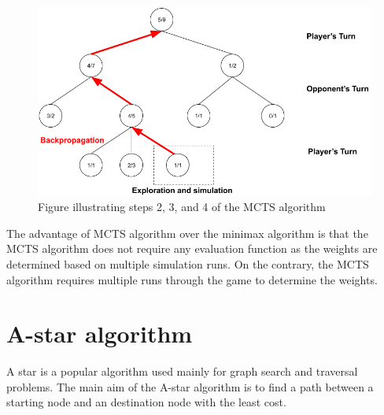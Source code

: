 \begin{figure}[!ht]
    \centering
    \includegraphics[width=\linewidth]{../img/MCTS2.png}
    \caption{Figure illustrating steps 2, 3, and 4 of the MCTS algorithm}
    \label{fig:MCTS2}
\end{figure}

The advantage of \ac{MCTS} algorithm over the minimax algorithm is that the \ac{MCTS} algorithm does not require any evaluation function as the weights are determined based on multiple simulation runs. On the contrary, the \ac{MCTS} algorithm requires multiple runs through the game to determine the weights.

\section{A-star algorithm}

A star is a popular algorithm \citep{Hart1968AFormal} used mainly for graph search and traversal problems. The main aim of the A-star algorithm is to find a path between a starting node and an destination node with the least cost.